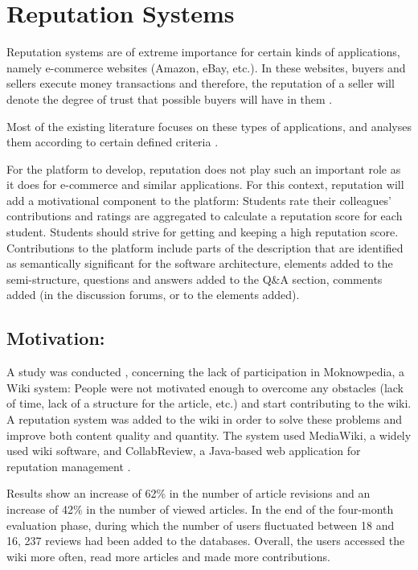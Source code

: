 \section{Reputation Systems}
\label{repsys}
Reputation systems are of extreme importance for certain kinds of applications, namely e-commerce websites (Amazon, eBay, etc.). In these websites, buyers and sellers execute money transactions and therefore, the reputation of a seller will denote the degree of trust that possible buyers will have in them \cite{vavilis2014reference}.

Most of the existing literature focuses on these types of applications, and analyses them according to certain defined criteria \cite{vavilis2014reference,liu2010evaluation}.

For the platform to develop, reputation does not play such an important role as it does for e-commerce and similar applications. For this context, reputation will add a motivational component to the platform: Students rate their colleagues' contributions and ratings are aggregated to calculate a reputation score for each student. Students should strive for getting and keeping a high reputation score. Contributions to the platform include parts of the description that are identified as semantically significant for the software architecture, elements added to the semi-structure, questions and answers added to the Q\&A section, comments added (in the discussion forums, or to the elements added).

\subsection{Motivation:}

A study was conducted \cite{dencheva2011dynamic}, concerning the lack of participation in Moknowpedia, a Wiki system: People were not motivated enough to overcome any obstacles (lack of time, lack of a structure for the article, etc.) and start contributing to the wiki. A reputation system was added to the wiki in order to solve these problems and improve both content quality and quantity. The system used MediaWiki, a widely used wiki software, and CollabReview, a Java-based web application for reputation management \cite{prause2008approach}. 

Results show an increase of 62\% in the number of article revisions and an increase of 42\% in the number of viewed articles. In the end of the four-month evaluation phase, during which the number of users fluctuated between 18 and 16, 237 reviews had been added to the databases. Overall, the users accessed the wiki more often, read more articles and made more contributions. 


